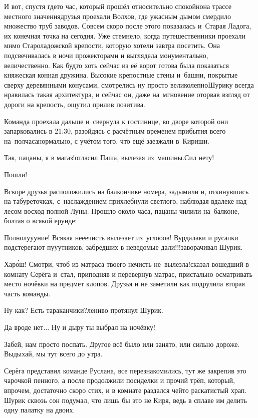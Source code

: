 И вот, спустя где\sdash то час, который прошёл относительно спокойно\mdash на трассе местного значения\mdash друзья проехали Волхов, где ужасным дымом смердило множество труб заводов. Совсем скоро после этого показалась и~Старая Ладога, их конечная точка на сегодня. Уже стемнело, когда путешественники проехали мимо Староладожской крепости, которую хотели завтра посетить. Она подсвечивалась в ночи прожекторами и выглядела монументально, величественно. Как будто хоть сейчас из её ворот готова была показаться княжеская конная дружина. Высокие крепостные стены и~башни, покрытые сверху деревянными конусами, смотрелись ну просто великолепно\mdash Шурику всегда нравилась такая архитектура, и сейчас он, даже на~мгновение оторвав взгляд от дороги на крепость, ощутил прилив позитива. 

Команда проехала дальше и~свернула к гостинице, во дворе которой они запарковались в 21:30, разойдясь с расчётным временем прибытия всего на~полчаса\mdash нормально, с учётом того, что ещё заезжали в~Кириши.

\diagdash Так, пацаны, я в магаз!\mdash огласил Паша, вылезая из~машины.\mdash Сил нету!

\diagdash Пошли!

Вскоре друзья расположились на балкончике номера, задымили и, откинувшись на табуреточках, с~наслаждением прихлебнули светлого, наблюдая вдалеке над лесом восход полной Луны. Прошло около часа, пацаны чилили на~балконе, болтая о всякой ерунде:

\diagdash Полнолу\sdash у\sdash уние! Всякая не\sdash е\sdash ечисть вылезает из~угло\sdash о\sdash ов! Вурдалаки и русалки подстерегают пу\sdash у\sdash утников, забредших в неведомые дали!!!\mdash заворачивал Шурик.

\diagdash Хар\'{о}ш! Смотри, чтоб из матраса твоего нечисть не~вылезла!\mdash сказал вошедший в комнату Серёга и~стал, приподняв и перевернув матрас, пристально осматривать место ночёвки на предмет клопов. Друзья и не заметили как подрулила вторая часть команды.

\diagdash Ну как? Есть тараканчики?\mdash лениво протянул Шурик.

\diagdash Да вроде нет$\ldots$ Ну и дыру ты выбрал на ночёвку! 

\diagdash Забей, нам просто поспать. Другое всё было или занято, или сильно дороже. Выдыхай, мы тут всего до утра.

Серёга представил команде Руслана, все перезнакомились, тут же закрепив это чарочкой пенного, а после продолжили посиделки и прочий трёп, который, впрочем, достаточно скоро стих, и в комнате раздался чей\sdash то раскатистый храп. Шурик сквозь сон подумал, что лишь бы это не Киря, ведь в сплаве им делить одну палатку на двоих.

\vspace{-0.2cm}
\begin{center}
\end{center}